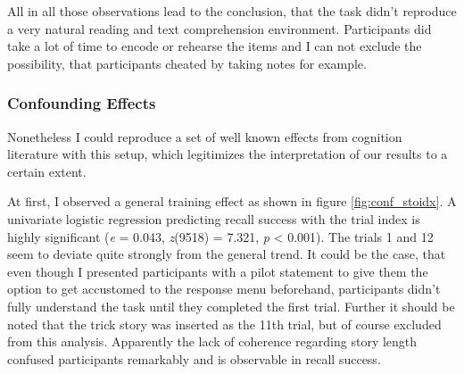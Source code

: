 \documentclass[a4paper,man,natbib,floatsintext,import]{apa6}
\begin{document}
All in all those observations lead to the conclusion, that the task didn't reproduce a very natural reading and text comprehension environment. Participants did take a lot of time to encode or rehearse the items and I can not exclude the possibility, that participants cheated by taking notes for example.

\subsubsection{Confounding Effects}
Nonetheless I could reproduce a set of well known effects from cognition literature with this setup, which legitimizes the interpretation of our results to a certain extent.

At first, I observed a general training effect as shown in figure \ref{fig:conf_stoidx}. A univariate logistic regression predicting recall success with the trial index is highly significant (\textit{e} = 0.043, \textit{z}(9518) = 7.321,  \textit{p} < 0.001). The trials 1 and 12 seem to deviate quite strongly from the general trend. It could be the case, that even though I presented participants with a pilot statement to give them the option to get accustomed to the response menu beforehand, participants didn't fully understand the task until they completed the first trial. Further it should be noted that the trick story was inserted as the 11th trial, but of course excluded from this analysis. Apparently the lack of coherence regarding story length confused participants remarkably and is observable in recall success.
\end{document}
